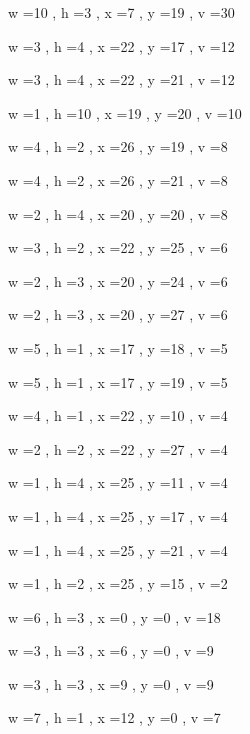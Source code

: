\documentclass[11pt]{article}
\begin{document}
\par
w =10 , h =3 , x =7 , y =19 , v =30
\par
w =3 , h =4 , x =22 , y =17 , v =12
\par
w =3 , h =4 , x =22 , y =21 , v =12
\par
w =1 , h =10 , x =19 , y =20 , v =10
\par
w =4 , h =2 , x =26 , y =19 , v =8
\par
w =4 , h =2 , x =26 , y =21 , v =8
\par
w =2 , h =4 , x =20 , y =20 , v =8
\par
w =3 , h =2 , x =22 , y =25 , v =6
\par
w =2 , h =3 , x =20 , y =24 , v =6
\par
w =2 , h =3 , x =20 , y =27 , v =6
\par
w =5 , h =1 , x =17 , y =18 , v =5
\par
w =5 , h =1 , x =17 , y =19 , v =5
\par
w =4 , h =1 , x =22 , y =10 , v =4
\par
w =2 , h =2 , x =22 , y =27 , v =4
\par
w =1 , h =4 , x =25 , y =11 , v =4
\par
w =1 , h =4 , x =25 , y =17 , v =4
\par
w =1 , h =4 , x =25 , y =21 , v =4
\par
w =1 , h =2 , x =25 , y =15 , v =2
\par
\newpage




w =6 , h =3 , x =0 , y =0 , v =18
\par
w =3 , h =3 , x =6 , y =0 , v =9
\par
w =3 , h =3 , x =9 , y =0 , v =9
\par
w =7 , h =1 , x =12 , y =0 , v =7
\par
\newpage
\end{document}
